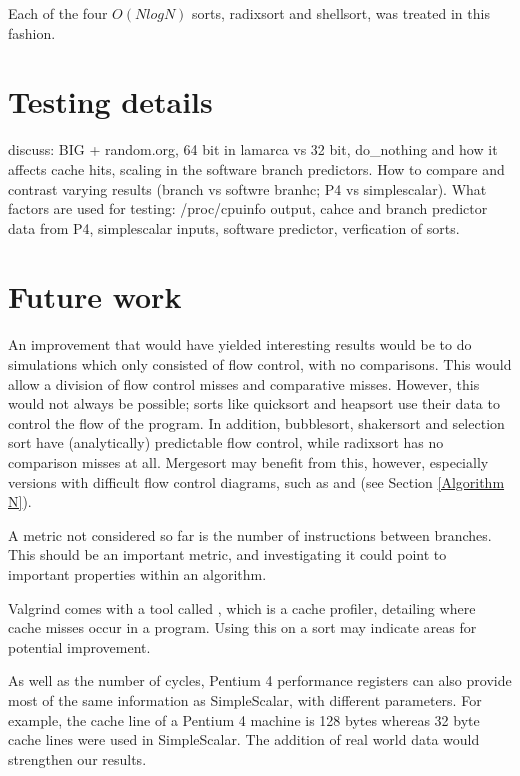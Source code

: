 Each of the four $O(NlogN)$ sorts, radixsort and shellsort, was treated in this fashion.

\section{Testing details}
discuss: BIG + random.org, 64 bit in lamarca vs 32 bit, do_nothing and how it
affects cache hits, scaling in the software branch predictors. How to compare
and contrast varying results (branch vs softwre branhc; P4 vs simplescalar).
What factors are used for testing: /proc/cpuinfo output, cahce and branch
predictor data from P4, simplescalar inputs, software predictor, verfication of
sorts.

\section{Future work}
An improvement that would have yielded interesting results would be to do simulations
which only consisted of flow control, with no comparisons. This would allow a
division of flow control misses and comparative misses. However, this would not
always be possible; sorts like quicksort and heapsort use their data to
control the flow of the program. In addition, bubblesort, shakersort and
selection sort have (analytically) predictable flow control, while radixsort has
no comparison misses at all. Mergesort may benefit from this, however, especially versions
with difficult flow control diagrams, such as  and  (see Section \ref{Algorithm N}).

A metric not considered so far is the number of instructions between branches.
This should be an important metric, and investigating it could point to
important properties within an algorithm.

Valgrind comes with a tool called , which is a cache
profiler, detailing where cache misses occur in a program. Using this on a
sort may indicate areas for potential improvement.

As well as the number of cycles, Pentium 4 performance registers can also provide
most of the same information as SimpleScalar, with different parameters. For
example, the cache line of a Pentium 4 machine is 128 bytes whereas 32 byte
cache lines were used in SimpleScalar. The addition of real world data would
strengthen our results.
